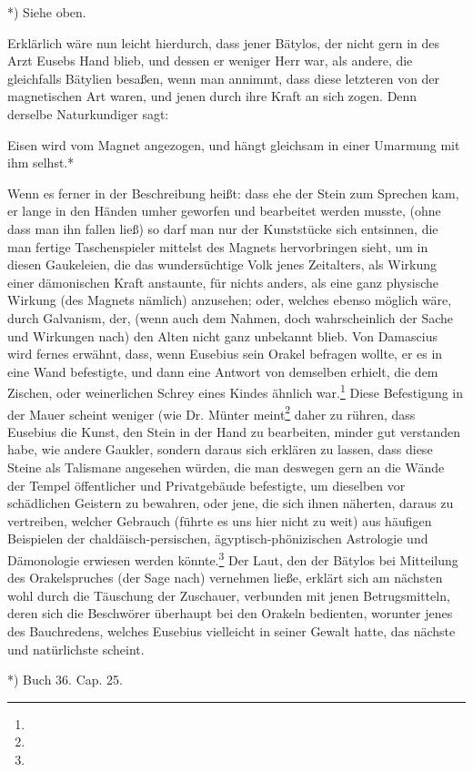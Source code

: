 \documentclass[a4paper, 11pt, oneside, polutonikogreek, german]{article}
\begin{document}
*) Siehe oben.

Erklärlich wäre nun leicht hierdurch, dass jener Bätylos, der nicht gern in des Arzt Eusebs Hand blieb, und dessen er weniger Herr war, als andere, die gleichfalls Bätylien besaßen, wenn man annimmt, dass diese letzteren von der magnetischen Art waren, und jenen durch ihre Kraft an sich zogen. Denn derselbe Naturkundiger sagt:

Eisen wird vom Magnet angezogen, und hängt gleichsam in einer Umarmung mit ihm selhst.*

Wenn es ferner in der Beschreibung heißt: dass ehe der Stein zum Sprechen kam, er lange in den Händen umher geworfen und bearbeitet werden musste, (ohne dass man ihn fallen ließ) so darf man nur der Kunststücke sich entsinnen, die man fertige Taschenspieler mittelst des Magnets hervorbringen sieht, um in diesen Gaukeleien, die das wundersüchtige Volk jenes Zeitalters, als Wirkung einer dämonischen Kraft anstaunte, für nichts anders, als eine ganz physische Wirkung (des Magnets nämlich) anzusehen; oder, welches ebenso möglich wäre, durch Galvanism, der, (wenn auch dem Nahmen, doch wahrscheinlich der Sache und Wirkungen nach) den Alten nicht ganz unbekannt blieb. Von Damascius wird fernes erwähnt, dass, wenn Eusebius sein Orakel befragen wollte, er es in eine Wand befestigte, und dann eine Antwort von demselben erhielt, die dem Zischen, oder weinerlichen Schrey eines Kindes ähnlich war.\footnote{} Diese Befestigung in der Mauer scheint weniger (wie Dr. Münter meint\footnote{} daher zu rühren, dass Eusebius die Kunst, den Stein in der Hand zu bearbeiten, minder gut verstanden habe, wie andere Gaukler, sondern daraus sich erklären zu lassen, dass diese Steine als Talismane angesehen würden, die man deswegen gern an die Wände der Tempel öffentlicher und Privatgebäude befestigte, um dieselben vor schädlichen Geistern zu bewahren, oder jene, die sich ihnen näherten, daraus zu vertreiben, welcher Gebrauch (führte es uns hier nicht zu weit) aus häufigen Beispielen der chaldäisch-persischen, ägyptisch-phönizischen Astrologie und Dämonologie erwiesen werden könnte.\footnote{} Der Laut, den der Bätylos bei Mitteilung des Orakelspruches (der Sage nach) vernehmen ließe, erklärt sich am nächsten wohl durch die Täuschung der Zuschauer, verbunden mit jenen Betrugsmitteln, deren sich die Beschwörer überhaupt bei den Orakeln bedienten, worunter jenes des Bauchredens, welches Eusebius vielleicht in seiner Gewalt hatte, das nächste und natürlichste scheint.

*) Buch 36. Cap. 25.
\end{document}
